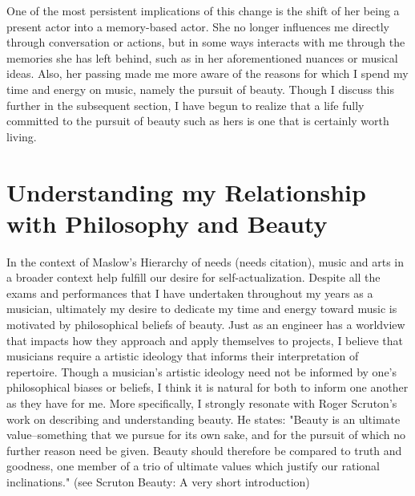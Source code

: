 \documentclass{article} %
\begin{document}
\begin{multicols}{2}
One of the most persistent implications of this change is the shift of her being a present actor into a memory-based actor.
She no longer influences me directly through conversation or actions, but in some ways interacts with me through the memories she has left behind, such as in her aforementioned nuances or musical ideas.
Also, her passing made me more aware of the reasons for which I spend my time and energy on music, namely the pursuit of beauty.
Though I discuss this further in the subsequent section, I have begun to realize that a life fully committed to the pursuit of beauty such as hers is one that is certainly worth living.

\section{Understanding my Relationship with Philosophy and Beauty}

In the context of Maslow's Hierarchy of needs (needs citation), music and arts in a broader context help fulfill our desire for self-actualization.
Despite all the exams and performances that I have undertaken throughout my years as a musician, ultimately my desire to dedicate my time and energy toward music is motivated by philosophical beliefs of beauty.
Just as an engineer has a worldview that impacts how they approach and apply themselves to projects, I believe that musicians require a artistic ideology that informs their interpretation of repertoire.
Though a musician's artistic ideology need not be informed by one's philosophical biases or beliefs, I think it is natural for both to inform one another as they have for me.
More specifically, I strongly resonate with Roger Scruton's work on describing and understanding beauty. 
He states: "Beauty is an ultimate value–something that we pursue for its own sake, and for the pursuit of which no further reason need be given. Beauty should therefore be compared to truth and goodness, one member of a trio of ultimate values which justify our rational inclinations." (see Scruton Beauty: A very short introduction)


\end{multicols}
\end{document}
